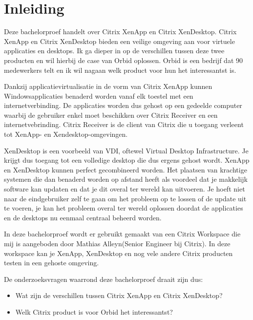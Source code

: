 
\chapter{Inleiding}
\label{ch:inleiding}
Deze bachelorproef handelt over Citrix XenApp en Citrix XenDesktop. Citrix XenApp en Citrix XenDesktop bieden een veilige omgeving aan voor virtuele applicaties en desktops. Ik ga dieper in op de verschillen tussen deze twee producten en wil hierbij de case van Orbid oplossen. Orbid is een bedrijf dat 90 medewerkers telt en ik wil nagaan welk product voor hun het interessantst is.

Dankzij applicatievirtualisatie in de vorm van Citrix XenApp kunnen Windowsapplicaties benaderd worden vanaf elk toestel met een internetverbinding. De applicaties worden dus gehost op een gedeelde computer waarbij de gebruiker enkel moet beschikken over Citrix Receiver en een internetvebrinding. Citrix Receiver is de client van Citrix die u toegang verleent tot XenApp- en Xendesktop-omgevingen.

XenDesktop is een voorbeeld van VDI, oftewel Virtual Desktop Infrastructure. Je krijgt dus toegang tot een volledige desktop die dus ergens gehost wordt. XenApp en XenDesktop kunnen perfect gecombineerd worden. Het plaatsen van krachtige systemen die dan benaderd worden op afstand heeft als voordeel dat je makkelijk software kan updaten en dat je dit overal ter wereld kan uitvoeren. Je hoeft niet naar de eindgebruiker zelf te gaan om het probleem op te lossen of de update uit te voeren, je kan het probleem overal ter wereld oplossen doordat de applicaties en de desktops nu eenmaal centraal beheerd worden.

In deze bachelorproef wordt er gebruikt gemaakt van een Citrix Workspace die mij is aangeboden door Mathias Alleyn(Senior Engineer bij Citrix). In deze workspace kan je XenApp, XenDesktop en nog vele andere Citrix producten testen in een gehoste omgeving.

De onderzoeksvragen waarrond deze bachelorproef draait zijn dus:
\begin{itemize}
\item Wat zijn de verschillen tussen Citrix XenApp en Citrix XenDesktop?
\item Welk Citrix product is voor Orbid het interessantst?
\end{itemize}
	
